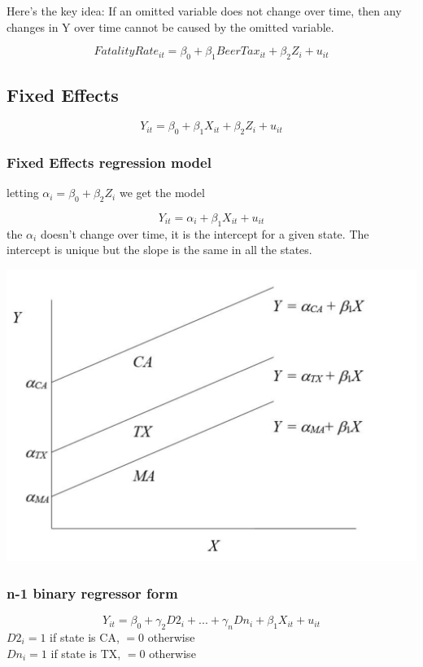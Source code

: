 \documentclass[a3paper, 8pt]{extarticle}
\begin{document}
\begin{multicols*}{5}
Here's the key idea:
If an omitted variable does not change over time, then any changes in Y over time cannot be caused by the omitted variable.

$$FatalityRate_{it}=\beta_0+\beta_1BeerTax_{it}+\beta_2Z_i+u_{it}$$


\subsection{Fixed Effects}
$$Y_{it}=\beta_0+\beta_1X_{it}+\beta_2Z_i+u_{it}$$
\subsubsection{Fixed Effects regression model}
letting $\alpha_i=\beta_0+\beta_2Z_i$ we get the model


\begin{equation}
    Y_{it}=\alpha_i+\beta_1X_{it}+u_{it}
\end{equation}
the $\alpha_i$ doesn't change over time, it is the intercept for a given state. The intercept is unique but the slope is the same in all the states.


\includegraphics[width = \columnwidth]{Screen Shot 2023-03-18 at 21.28.01.png}

\subsubsection{n-1 binary regressor form}
$$Y_{it}=\beta_0+\gamma_{2}D2_i+...+\gamma_{n}Dn_i+\beta_1X_{it}+u_{it}$$
$D2_i= 1$ if state is CA, $= 0$ otherwise \\
$Dn_i= 1$ if state is TX, $= 0$ otherwise


\end{multicols*}
\end{document}
